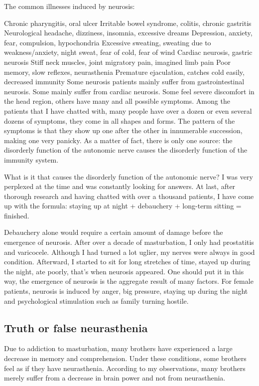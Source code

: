 \documentclass[
]{book}
\begin{document}
The common illnesses induced by neurosis:

Chronic pharyngitis, oral ulcer
Irritable bowel syndrome, colitis, chronic gastritis
Neurological headache, dizziness, insomnia, excessive dreams
Depression, anxiety, fear, compulsion, hypochondria
Excessive sweating, sweating due to weakness/anxiety, night sweat, fear of cold, fear of wind
Cardiac neurosis, gastric neurosis
Stiff neck muscles, joint migratory pain, imagined limb pain
Poor memory, slow reflexes, neurasthenia
Premature ejaculation, catches cold easily, decreased immunity
Some neurosis patients mainly suffer from gastrointestinal neurosis. Some mainly suffer from cardiac neurosis. Some feel severe discomfort in the head region, others have many and all possible symptoms. Among the patients that I have chatted with, many people have over a dozen or even several dozens of symptoms, they come in all shapes and forms. The pattern of the symptoms is that they show up one after the other in innumerable succession, making one very panicky. As a matter of fact, there is only one source: the disorderly function of the autonomic nerve causes the disorderly function of the immunity system.

What is it that causes the disorderly function of the autonomic nerve? I was very perplexed at the time and was constantly looking for answers. At last, after thorough research and having chatted with over a thousand patients, I have come up with the formula: staying up at night + debauchery + long-term sitting = finished.

Debauchery alone would require a certain amount of damage before the emergence of neurosis. After over a decade of masturbation, I only had prostatitis and varicocele. Although I had turned a lot uglier, my nerves were always in good condition. Afterward, I started to sit for long stretches of time, stayed up during the night, ate poorly, that's when neurosis appeared. One should put it in this way, the emergence of neurosis is the aggregate result of many factors. For female patients, neurosis is induced by anger, big pressure, staying up during the night and psychological stimulation such as family turning hostile.

\hypertarget{truth-or-false-neurasthenia}{%
\subsection{Truth or false neurasthenia}\label{truth-or-false-neurasthenia}}

Due to addiction to masturbation, many brothers have experienced a large decrease in memory and comprehension. Under these conditions, some brothers feel as if they have neurasthenia. According to my observations, many brothers merely suffer from a decrease in brain power and not from neurasthenia.
\end{document}
